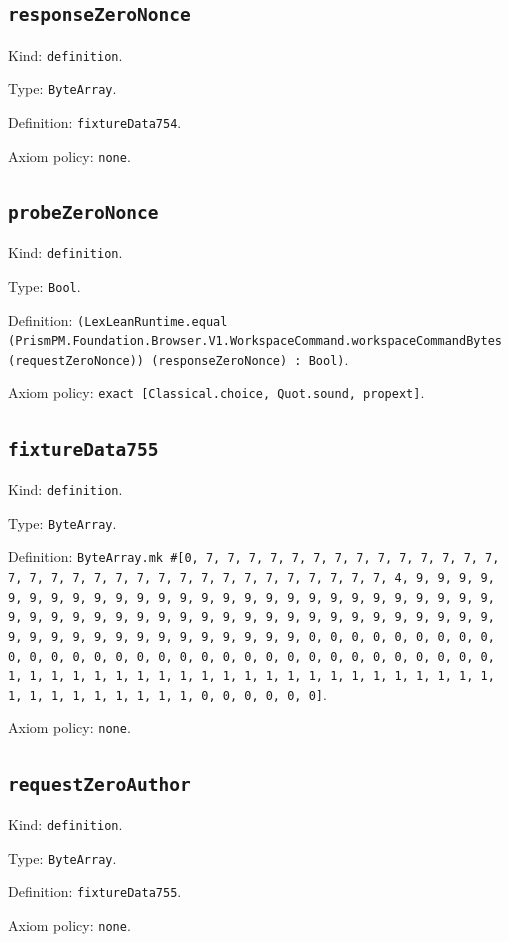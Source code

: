 \documentclass[11pt]{article}
\begin{document}
\subsection*{\texttt{responseZeroNonce}}
\noindent Kind: \texttt{definition}.\par
\noindent Type: \texttt{ByteArray}.\par
\noindent Definition: \texttt{fixtureData754}.\par
\noindent Axiom policy: \texttt{none}.\par
\subsection*{\texttt{probeZeroNonce}}
\noindent Kind: \texttt{definition}.\par
\noindent Type: \texttt{Bool}.\par
\noindent Definition: \texttt{(LexLeanRuntime.equal (PrismPM.Foundation.Browser.V1.WorkspaceCommand.workspaceCommandBytes (requestZeroNonce)) (responseZeroNonce) : Bool)}.\par
\noindent Axiom policy: \texttt{exact [Classical.choice, Quot.sound, propext]}.\par
\subsection*{\texttt{fixtureData755}}
\noindent Kind: \texttt{definition}.\par
\noindent Type: \texttt{ByteArray}.\par
\noindent Definition: \texttt{ByteArray.mk \#[0, 7, 7, 7, 7, 7, 7, 7, 7, 7, 7, 7, 7, 7, 7, 7, 7, 7, 7, 7, 7, 7, 7, 7, 7, 7, 7, 7, 7, 7, 7, 7, 7, 4, 9, 9, 9, 9, 9, 9, 9, 9, 9, 9, 9, 9, 9, 9, 9, 9, 9, 9, 9, 9, 9, 9, 9, 9, 9, 9, 9, 9, 9, 9, 9, 9, 9, 9, 9, 9, 9, 9, 9, 9, 9, 9, 9, 9, 9, 9, 9, 9, 9, 9, 9, 9, 9, 9, 9, 9, 9, 9, 9, 9, 9, 9, 9, 9, 0, 0, 0, 0, 0, 0, 0, 0, 0, 0, 0, 0, 0, 0, 0, 0, 0, 0, 0, 0, 0, 0, 0, 0, 0, 0, 0, 0, 0, 0, 0, 0, 1, 1, 1, 1, 1, 1, 1, 1, 1, 1, 1, 1, 1, 1, 1, 1, 1, 1, 1, 1, 1, 1, 1, 1, 1, 1, 1, 1, 1, 1, 1, 1, 0, 0, 0, 0, 0, 0]}.\par
\noindent Axiom policy: \texttt{none}.\par
\subsection*{\texttt{requestZeroAuthor}}
\noindent Kind: \texttt{definition}.\par
\noindent Type: \texttt{ByteArray}.\par
\noindent Definition: \texttt{fixtureData755}.\par
\noindent Axiom policy: \texttt{none}.\par
\end{document}

